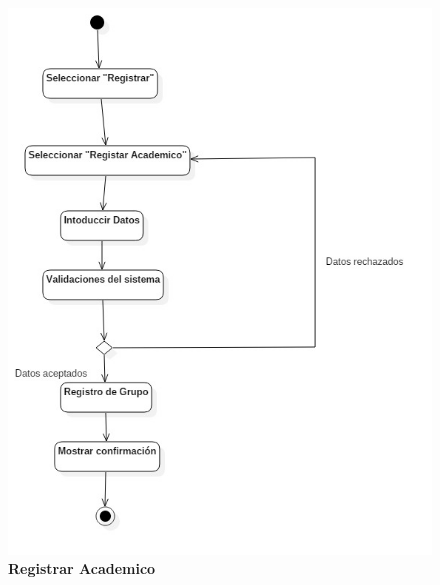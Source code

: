 \begin{figure}[H]
  \centering
    \includegraphics[scale=.8,angle=0]{project/Actividades/Registrar_Academico.jpg}
  \caption{\textbf{Registrar Academico}}
\end{figure}
